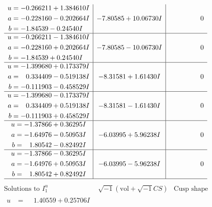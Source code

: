 \documentclass[1p]{elsarticle_modified}
\theoremstyle{definition}
\newcommand{\I}{\sqrt{-1}}
\begin{document}
$$\begin{array}{c|c|c}
\begin{aligned}
u &= -0.266211 + 1.384610 I \\
a &= -0.228160 - 0.202664 I \\
b &= -1.84539 - 0.24540 I\end{aligned}
 & -7.80585 + 10.06730 I & \phantom{-0.000000 } 0 \\ \hline\begin{aligned}
u &= -0.266211 - 1.384610 I \\
a &= -0.228160 + 0.202664 I \\
b &= -1.84539 + 0.24540 I\end{aligned}
 & -7.80585 - 10.06730 I & \phantom{-0.000000 } 0 \\ \hline\begin{aligned}
u &= -1.399680 + 0.173379 I \\
a &= \phantom{-}0.334409 - 0.519138 I \\
b &= -0.111903 - 0.458529 I\end{aligned}
 & -8.31581 + 1.61430 I & \phantom{-0.000000 } 0 \\ \hline\begin{aligned}
u &= -1.399680 - 0.173379 I \\
a &= \phantom{-}0.334409 + 0.519138 I \\
b &= -0.111903 + 0.458529 I\end{aligned}
 & -8.31581 - 1.61430 I & \phantom{-0.000000 } 0 \\ \hline\begin{aligned}
u &= -1.37866 + 0.36295 I \\
a &= -1.64976 - 0.50953 I \\
b &= \phantom{-}1.80542 - 0.82492 I\end{aligned}
 & -6.03995 + 5.96238 I & \phantom{-0.000000 } 0 \\ \hline\begin{aligned}
u &= -1.37866 - 0.36295 I \\
a &= -1.64976 + 0.50953 I \\
b &= \phantom{-}1.80542 + 0.82492 I\end{aligned}
 & -6.03995 - 5.96238 I & \phantom{-0.000000 } 0\\
 \hline 
 \end{array}$$\newpage$$\begin{array}{c|c|c}  
\text{Solutions to }I^u_{1}& \I (\text{vol} + \sqrt{-1}CS) & \text{Cusp shape}\\
 \hline 
\begin{aligned}
u &= \phantom{-}1.40559 + 0.25706 I \\

\end{aligned}
\end{array}$$
\end{document}
